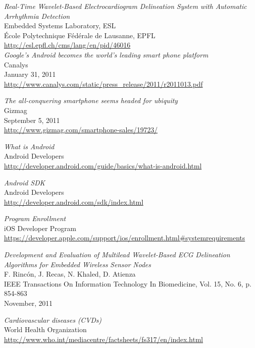 \begin{thebibliography}{widest-label}

 	\emph{Real-Time Wavelet-Based Electrocardiogram Delineation System with Automatic Arrhythmia Detection}\\
 	Embedded Systems Laboratory, ESL\\
 	École Polytechnique Fédérale de Lausanne, EPFL\\
 	\url{http://esl.epfl.ch/cms/lang/en/pid/46016}\\
	
	\emph{Google’s Android becomes the world’s leading smart phone platform}\\
	Canalys\\
	January 31, 2011\\
	\url{http://www.canalys.com/static/press_release/2011/r2011013.pdf}

	\emph{The all-conquering smartphone seems headed for ubiquity}\\
	Gizmag\\
	September 5, 2011\\
	\url{http://www.gizmag.com/smartphone-sales/19723/}
	
	\emph{What is Android}\\
	Android Developers\\
	\url{http://developer.android.com/guide/basics/what-is-android.html}

	\emph{Android SDK}\\
	Android Developers\\
	\url{http://developer.android.com/sdk/index.html}
	
	\emph{Program Enrollment}\\
	iOS Developer Program\\
	\url{https://developer.apple.com/support/ios/enrollment.html#systemrequirements}
	
	\emph{Development and Evaluation of Multilead Wavelet-Based ECG Delineation Algorithms for Embedded Wireless
		Sensor Nodes}\\
	F. Rincón, J. Recas, N. Khaled, D. Atienza\\
	IEEE Transactions On Information Technology In Biomedicine, Vol. 15, No. 6, p. 854-863\\
	November, 2011
	
	\emph{Cardiovascular diseases (CVDs)}\\
	World Health Organization\\
	\url{http://www.who.int/mediacentre/factsheets/fs317/en/index.html}
	

\end{thebibliography}
